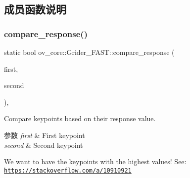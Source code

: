 \subsection{成员函数说明}
\mbox{\label{classov__core_1_1Grider__FAST_a62a844fcba586eb31998ecf467634d6e}} 
\subsubsection{\texorpdfstring{compare\+\_\+response()}{compare\_response()}}
{\footnotesize\ttfamily static bool ov\+\_\+core\+::\+Grider\+\_\+\+F\+A\+S\+T\+::compare\+\_\+response (\begin{DoxyParamCaption}\item[{cv\+::\+Key\+Point}]{first,  }\item[{cv\+::\+Key\+Point}]{second }\end{DoxyParamCaption})\hspace{0.3cm}{\ttfamily [inline]}, {\ttfamily [static]}}



Compare keypoints based on their response value. 


\begin{DoxyParams}{参数}
{\em first} & First keypoint \\
\hline
{\em second} & Second keypoint\\
\hline
\end{DoxyParams}
We want to have the keypoints with the highest values! See\+: \href{https://stackoverflow.com/a/10910921}{\tt https\+://stackoverflow.\+com/a/10910921} \mbox{\label{classov__core_1_1Grider__FAST_a36acfad18dc36878776dd4fa21165eac}} 
